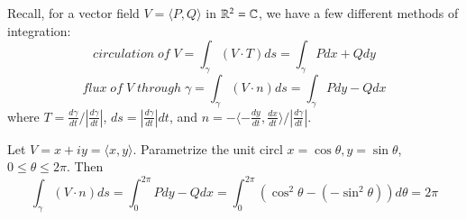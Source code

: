 \documentclass[12pt, a4paper, oneside, openright, titlepage]{book}
\begin{document}
Recall, for a vector field $V = \langle P,Q\rangle$ in $\mathbb R^2 = \mathbb C$, we have a few different methods of integration: \begin{equation*}
    circulation\;of\;V = \int_{\gamma}(V\cdot T)ds = \int_{\gamma}Pdx+Qdy
\end{equation*}
\begin{equation*}
    flux\;of\;V\;through\;\gamma = \int_{\gamma}(V\cdot n)ds = \int_{\gamma}Pdy-Qdx
\end{equation*}
where $T = \frac{d\gamma}{dt}/\left|\frac{d\gamma}{dt}\right|$, $ds = \left|\frac{d\gamma}{dt}\right|dt$, and $n = -\langle -\frac{dy}{dt},\frac{dx}{dt}\rangle/\left|\frac{d\gamma}{dt}\right|$.

\begin{eg}
    Let $V = x+iy = \langle x,y\rangle$. Parametrize the unit circl $x = \cos\theta, y = \sin\theta$, $0 \leq \theta \leq 2\pi$. Then 
    \begin{equation*}
        \int_{\gamma}(V\cdot n)ds = \int_0^{2\pi}Pdy-Qdx = \int_0^{2\pi}(\cos^2\theta-(-\sin^2\theta))d\theta = 2\pi
    \end{equation*}
\end{eg}
\end{document}
